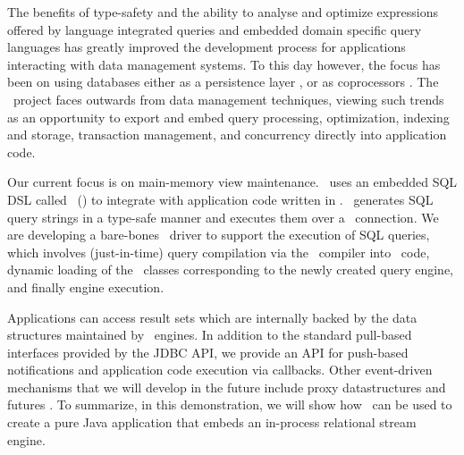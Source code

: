 The benefits of type-safety and the ability to analyse and optimize expressions
offered by language integrated queries and embedded domain specific query
languages has greatly improved the development process for applications
interacting with data management systems. To this day however, the focus has
been on using databases either as a persistence layer \todo{[xxx]}, or as
coprocessors \todo{[Ferry]}. The \compiler\ project faces outwards from data
management techniques, viewing such trends as an opportunity to export
and embed query processing, optimization, indexing and storage,
transaction management, and concurrency directly into application code.



Our current focus is on main-memory view maintenance. \compiler\ uses an
embedded SQL DSL called \dsl\ (\dslurl) to integrate with application code
written in \targetlang.
\dsl\ generates SQL query strings in a type-safe manner and executes them
over a \driver\ connection. We are developing a bare-bones \driver\ driver to
support the execution of SQL queries, which involves (just-in-time) query
compilation via the \compiler\ compiler into \targetlang\ code, dynamic loading
of the \targetlang\ classes corresponding to the newly created query engine, and
finally engine execution.


Applications can access
result sets which are internally backed by the data structures maintained by
\compiler\ engines. In addition to the standard pull-based interfaces provided
by the JDBC API, we provide an API for push-based notifications and application
code execution via callbacks. Other event-driven mechanisms that we will develop
in the future include proxy datastructures and futures \todo{[CIDR]}. To
summarize, in this demonstration, we will show how \compiler\ can be used to
create a pure Java application that embeds an in-process relational stream
engine.


